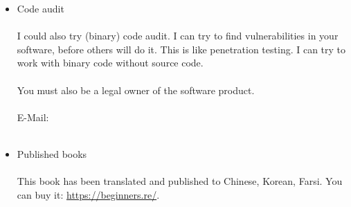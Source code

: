 {\begin{minipage}{0.9\linewidth}
\begin{itemize}
\item Code audit\\
\\
I could also try (binary) code audit.
I can try to find vulnerabilities in your software, before others will do it.
This is like penetration testing.
I can try to work with binary code without source code.\\
\\
You must also be a legal owner of the software product.\\
\\
E-Mail: \EMAIL \\
\\
\item Published books\\
\\
This book has been translated and published to
Chinese,
Korean,
Farsi.
You can buy it: \url{https://beginners.re/}.

\end{itemize}

\end{minipage}}


